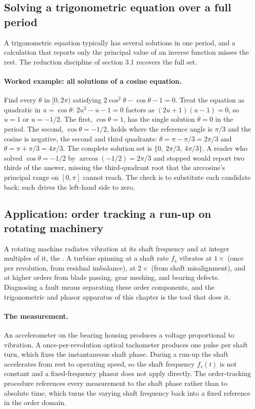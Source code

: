 \subsection{Solving a trigonometric equation over a full period}

A trigonometric equation typically has several solutions in one period, and a
calculation that reports only the principal value of an inverse function
misses the rest. The reduction discipline of section 3.1 recovers the full
set.

\paragraph{Worked example: all solutions of a cosine equation.} Find every
$\theta$ in $[0, 2\pi)$ satisfying $2\cos^{2}\theta - \cos\theta - 1 = 0$.
Treat the equation as quadratic in $u = \cos\theta$: $2u^{2} - u - 1 = 0$
factors as $(2u + 1)(u - 1) = 0$, so $u = 1$ or $u = -1/2$. The first,
$\cos\theta = 1$, has the single solution $\theta = 0$ in the period. The
second, $\cos\theta = -1/2$, holds where the reference angle is $\pi/3$ and
the cosine is negative, the second and third quadrants: $\theta = \pi -
\pi/3 = 2\pi/3$ and $\theta = \pi + \pi/3 = 4\pi/3$. The complete solution
set is $\{0,\ 2\pi/3,\ 4\pi/3\}$. A reader who solved $\cos\theta = -1/2$ by
$\arccos(-1/2) = 2\pi/3$ and stopped would report two thirds of the answer,
missing the third-quadrant root that the arccosine's principal range on
$[0, \pi]$ cannot reach. The check is to substitute each candidate back;
each drives the left-hand side to zero.

\subsection{Application: order tracking a run-up on rotating machinery}

A rotating machine radiates vibration at its shaft frequency and at integer
multiples of it, the . A turbine spinning at a shaft rate
$f_{s}$ vibrates at $1\times$ (once per revolution, from residual imbalance),
at $2\times$ (from shaft misalignment), and at higher orders from blade
passing, gear meshing, and bearing defects. Diagnosing a fault means
separating these order components, and the trigonometric and phasor
apparatus of this chapter is the tool that does it.

\paragraph{The measurement.} An accelerometer on the bearing housing produces
a voltage proportional to vibration. A once-per-revolution optical tachometer
produces one pulse per shaft turn, which fixes the instantaneous shaft phase.
During a run-up the shaft accelerates from rest to operating speed, so the
shaft frequency $f_{s}(t)$ is not constant and a fixed-frequency phasor does
not apply directly. The order-tracking procedure references every measurement
to the shaft phase rather than to absolute time, which turns the varying
shaft frequency back into a fixed reference in the order domain.

